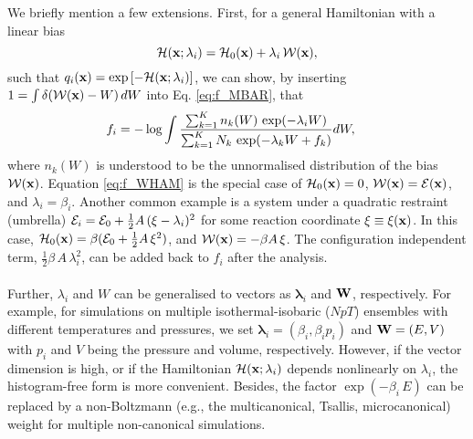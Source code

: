 \documentclass{gMOS2e}
\begin{document}
We briefly mention a few extensions.
%
First,
for a general Hamiltonian
with a linear bias
\[
\mathcal{H}(\mathbf{x}; \lambda_i) = \mathcal{H}_0(\mathbf{x}) + \lambda_i \, \mathcal{W}(\mathbf{x}),
\]
such that $q_i(\mathbf{x}) = \exp\left[ -\mathcal{H}(\mathbf{x}; \lambda_i) \right]$,
%
we can show,
by inserting
$1 = \int \delta(\mathcal{W}(\mathbf{x}) - W) \, dW$
into Eq. \eqref{eq:f_MBAR},
that
%
\begin{align}
f_i
&=
-\log
  \int
    \frac{
      \sum_{k = 1}^K n_k(W) \, \exp(-\lambda_i W)
    }
    {
      \sum_{k = 1}^K N_k \, \exp(-\lambda_k W + f_k)
    }
    d W,
\notag
\end{align}
%
where
$n_k(W)$
is understood to be
the unnormalised distribution of
the bias $\mathcal{W}(\mathbf{x})$.
%
Equation \eqref{eq:f_WHAM}
is the special case of
$\mathcal{H}_0(\mathbf{x}) = 0$,
$\mathcal{W}(\mathbf{x}) = \mathcal{E}(\mathbf{x})$,
and $\lambda_i = \beta_i$.
%
Another common example
is a system under a quadratic restraint (umbrella)
$\mathcal{E}_i = \mathcal{E}_0 + \frac 1 2 A \, (\xi - \lambda_i)^2$
for some reaction coordinate $\xi \equiv \xi(\mathbf{x})$.
%
In this case,
$\mathcal{H}_0(\mathbf{x}) = \beta (\mathcal{E}_0 + \frac 1 2 A \, \xi^2)$,
and
$\mathcal{W}(\mathbf{x}) = -\beta A \, \xi$.
%
The configuration independent term,
$\frac 1 2 \beta \, A \, \lambda_i^2$,
can be added back to $f_i$ after the analysis.



\paragraph*{}



Further,
$\lambda_i$ and $W$
can be generalised
to vectors as
$\bm{\lambda}_i$
and
$\mathbf{W}$, respectively.
%
For example,
for simulations
on multiple isothermal-isobaric ($NpT$) ensembles
with different temperatures and pressures,
%
we set
$\bm{\lambda}_i = (\beta_i, \beta_i p_i)$
and
$\mathbf{W} = (E, V)$
with
$p_i$ and $V$
being the pressure and volume,
respectively.
%
However, if the vector dimension is high,
or if the Hamiltonian $\mathcal{H}(\mathbf{x}; \lambda_i)$
depends nonlinearly on $\lambda_i$,
the histogram-free form is more convenient\cite{
shirts2008}.
%
Besides,
the factor $\exp(-\beta_i \, E)$
can be replaced by
a non-Boltzmann
(e.g., the multicanonical\cite{
mezei1987, berg1992, lee1993},
Tsallis\cite{tsallis1988},
microcanonical\cite{
yan2003, martin-mayor2007})
weight
for multiple non-canonical simulations\cite{
kim2011}.
%
\end{document}
